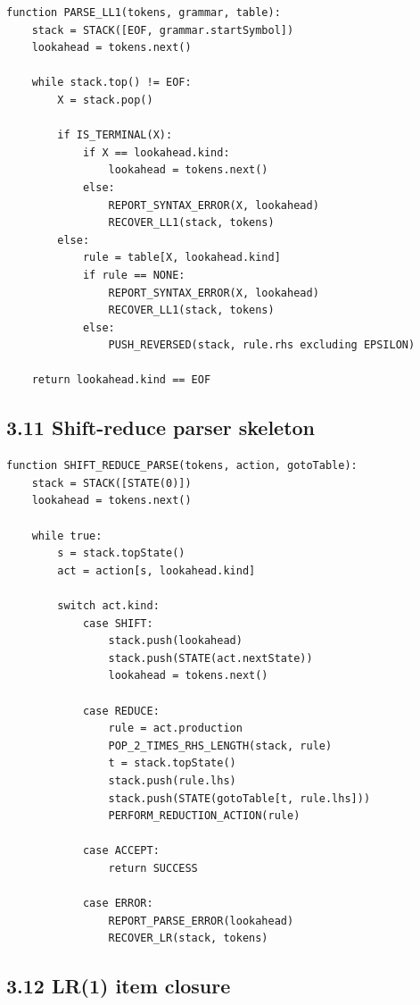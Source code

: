 \documentclass[10pt,letterpaper]{article}
\begin{document}
\begin{verbatim}
function PARSE_LL1(tokens, grammar, table):
    stack = STACK([EOF, grammar.startSymbol])
    lookahead = tokens.next()

    while stack.top() != EOF:
        X = stack.pop()

        if IS_TERMINAL(X):
            if X == lookahead.kind:
                lookahead = tokens.next()
            else:
                REPORT_SYNTAX_ERROR(X, lookahead)
                RECOVER_LL1(stack, tokens)
        else:
            rule = table[X, lookahead.kind]
            if rule == NONE:
                REPORT_SYNTAX_ERROR(X, lookahead)
                RECOVER_LL1(stack, tokens)
            else:
                PUSH_REVERSED(stack, rule.rhs excluding EPSILON)

    return lookahead.kind == EOF
\end{verbatim}

\subsection*{3.11 Shift-reduce parser skeleton}
{}

\begin{verbatim}
function SHIFT_REDUCE_PARSE(tokens, action, gotoTable):
    stack = STACK([STATE(0)])
    lookahead = tokens.next()

    while true:
        s = stack.topState()
        act = action[s, lookahead.kind]

        switch act.kind:
            case SHIFT:
                stack.push(lookahead)
                stack.push(STATE(act.nextState))
                lookahead = tokens.next()

            case REDUCE:
                rule = act.production
                POP_2_TIMES_RHS_LENGTH(stack, rule)
                t = stack.topState()
                stack.push(rule.lhs)
                stack.push(STATE(gotoTable[t, rule.lhs]))
                PERFORM_REDUCTION_ACTION(rule)

            case ACCEPT:
                return SUCCESS

            case ERROR:
                REPORT_PARSE_ERROR(lookahead)
                RECOVER_LR(stack, tokens)
\end{verbatim}

\subsection*{3.12 LR(1) item closure}
{}
\end{document}
